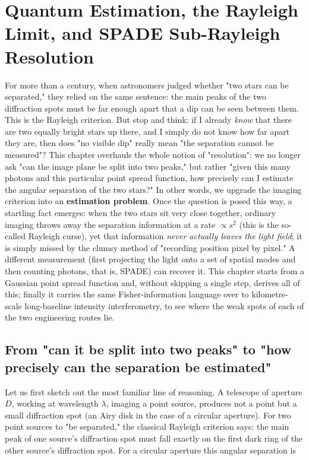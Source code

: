 \chapter{Quantum Estimation, the Rayleigh Limit, and SPADE Sub-Rayleigh Resolution}
\label{chap:e12}

\begin{chapteropening}
For more than a century, when astronomers judged whether "two stars can be separated," they relied on the same sentence: the main peaks of the two diffraction spots must be far enough apart that a dip can be seen between them. This is the Rayleigh criterion. But stop and think: if I already \emph{know} that there are two equally bright stars up there, and I simply do not know how far apart they are, then does "no visible dip" really mean "the separation cannot be measured"? This chapter overhauls the whole notion of "resolution": we no longer ask "can the image plane be split into two peaks," but rather "given this many photons and this particular point spread function, how precisely can I estimate the angular separation of the two stars?" In other words, we upgrade the imaging criterion into an \textbf{estimation problem}. Once the question is posed this way, a startling fact emerges: when the two stars sit very close together, ordinary imaging throws away the separation information at a rate $\propto s^2$ (this is the so-called Rayleigh curse), yet that information \emph{never actually leaves the light field}; it is simply missed by the clumsy method of "recording position pixel by pixel." A different measurement (first projecting the light onto a set of spatial modes and then counting photons, that is, SPADE) can recover it. This chapter starts from a Gaussian point spread function and, without skipping a single step, derives all of this; finally it carries the same Fisher-information language over to kilometre-scale long-baseline intensity interferometry, to see where the weak spots of each of the two engineering routes lie.
\end{chapteropening}


\section{From "can it be split into two peaks" to "how precisely can the separation be estimated"}
\label{sec:e12-rayleigh}

Let us first sketch out the most familiar line of reasoning. A telescope of aperture $D$, working at wavelength $\lambda$, imaging a point source, produces not a point but a small diffraction spot (an Airy disk in the case of a circular aperture). For two point sources to "be separated," the classical Rayleigh criterion says: the main peak of one source's diffraction spot must fall exactly on the first dark ring of the other source's diffraction spot. For a circular aperture this angular separation is


